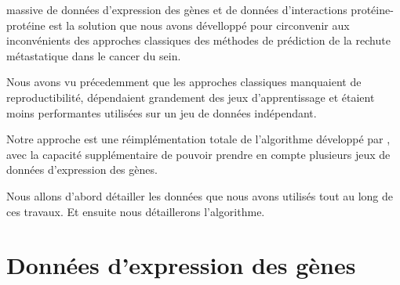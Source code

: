 			 massive de données d'expression des gènes et de données d'interactions protéine-protéine est la solution que nous avons dévelloppé pour circonvenir aux inconvénients des approches classiques des méthodes de prédiction de la rechute métastatique dans le cancer du sein.

			Nous avons vu précedemment que les approches classiques manquaient de reproductibilité, dépendaient grandement des jeux d'apprentissage et étaient moins performantes utilisées sur un jeu de données indépendant.

			Notre approche est une réimplémentation totale de l'algorithme développé par \citeauthor{Chuang2007}, avec la capacité supplémentaire de pouvoir prendre en compte plusieurs jeux de données d'expression des gènes.

			Nous allons d'abord détailler les données que nous avons utilisés tout au long de ces travaux.
			Et ensuite nous détaillerons l'algorithme.

	\section{\textcolor{mygreen}{Données d'expression des gènes}}\label{sec:GEP}


